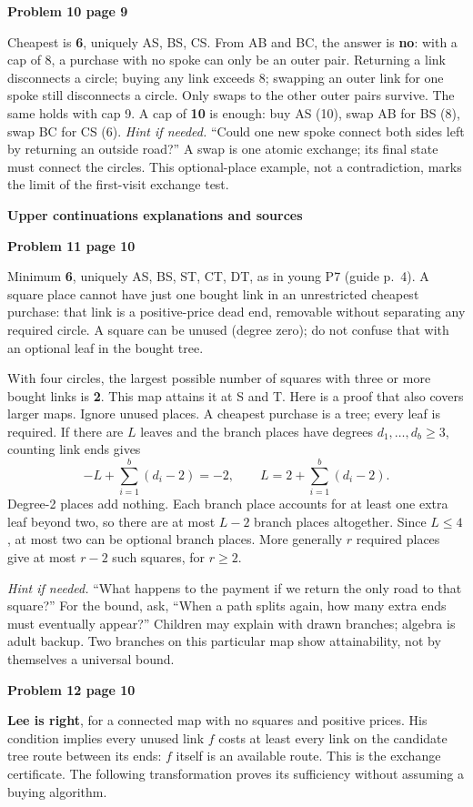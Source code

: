 \documentclass[11pt]{article}
\newcommand{\head}[1]{\par{\large\bfseries #1}\par}
\newcommand{\sub}[1]{\par\textbf{#1}\par}
\newcommand{\hint}[1]{\textit{Hint if needed.} #1}
\begin{document}
\sub{Problem 10 page 9}
Cheapest is \textbf{6}, uniquely AS, BS, CS. From AB and BC, the answer is \textbf{no}: with a cap of 8, a purchase with no spoke can only be an outer pair. Returning a link disconnects a circle; buying any link exceeds 8; swapping an outer link for one spoke still disconnects a circle. Only swaps to the other outer pairs survive. The same holds with cap 9. A cap of \textbf{10} is enough: buy AS (10), swap AB for BS (8), swap BC for CS (6). \hint{``Could one new spoke connect both sides left by returning an outside road?''} A swap is one atomic exchange; its final state must connect the circles. This optional-place example, not a contradiction, marks the limit of the first-visit exchange test.
\newpage
\head{Upper continuations explanations and sources}
\sub{Problem 11 page 10}
Minimum \textbf{6}, uniquely AS, BS, ST, CT, DT, as in young P7 (guide p.~4). A square place cannot have just one bought link in an unrestricted cheapest purchase: that link is a positive-price dead end, removable without separating any required circle. A square can be unused (degree zero); do not confuse that with an optional leaf in the bought tree.

With four circles, the largest possible number of squares with three or more bought links is \textbf{2}. This map attains it at S and T. Here is a proof that also covers larger maps. Ignore unused places. A cheapest purchase is a tree; every leaf is required. If there are $L$ leaves and the branch places have degrees $d_1,\ldots,d_b\ge3$, counting link ends gives
\[
 -L+\sum_{i=1}^{b}(d_i-2)=-2,\qquad
 L=2+\sum_{i=1}^{b}(d_i-2).
\]
Degree-2 places add nothing. Each branch place accounts for at least one extra leaf beyond two, so there are at most $L-2$ branch places altogether. Since $L\le4$, at most two can be optional branch places. More generally $r$ required places give at most $r-2$ such squares, for $r\ge2$.

\hint{``What happens to the payment if we return the only road to that square?''} For the bound, ask, ``When a path splits again, how many extra ends must eventually appear?'' Children may explain with drawn branches; algebra is adult backup. Two branches on this particular map show attainability, not by themselves a universal bound.

\sub{Problem 12 page 10}
\textbf{Lee is right}, for a connected map with no squares and positive prices. His condition implies every unused link $f$ costs at least every link on the candidate tree route between its ends: $f$ itself is an available route. This is the exchange certificate. The following transformation proves its sufficiency without assuming a buying algorithm.
\end{document}
